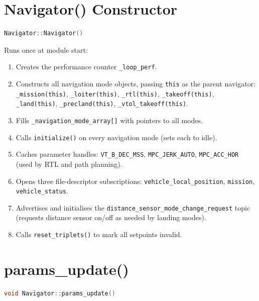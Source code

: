 \documentclass[12pt,a4paper]{article}
\begin{document}
\section{Navigator() Constructor}

\begin{lstlisting}[language=C++]
Navigator::Navigator()
\end{lstlisting}

Runs once at module start:
\begin{enumerate}
  \item Creates the performance counter \texttt{\_loop\_perf}.
  \item Constructs all navigation mode objects, passing \texttt{this} as the
        parent navigator:
        \texttt{\_mission(this)}, \texttt{\_loiter(this)}, \texttt{\_rtl(this)},
        \texttt{\_takeoff(this)}, \texttt{\_land(this)},
        \texttt{\_precland(this)}, \texttt{\_vtol\_takeoff(this)}.
  \item Fills \texttt{\_navigation\_mode\_array[]} with pointers to all modes.
  \item Calls \texttt{initialize()} on every navigation mode (sets each to idle).
  \item Caches parameter handles:
        \texttt{VT\_B\_DEC\_MSS}, \texttt{MPC\_JERK\_AUTO}, \texttt{MPC\_ACC\_HOR}
        (used by RTL and path planning).
  \item Opens three file-descriptor subscriptions:
        \texttt{vehicle\_local\_position},
        \texttt{mission},
        \texttt{vehicle\_status}.
  \item Advertises and initialises the
        \texttt{distance\_sensor\_mode\_change\_request} topic (requests
        distance sensor on/off as needed by landing modes).
  \item Calls \texttt{reset\_triplets()} to mark all setpoints invalid.
\end{enumerate}

\section{params\_update()}

\begin{lstlisting}[language=C++]
void Navigator::params_update()
\end{lstlisting}
\end{document}
